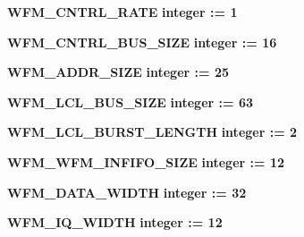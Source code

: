\begin{DoxyCompactItemize}
\item 
{\bf W\+F\+M\+\_\+\+C\+N\+T\+R\+L\+\_\+\+R\+A\+TE} {\bfseries {\bfseries \textcolor{comment}{integer}\textcolor{vhdlchar}{ }\textcolor{vhdlchar}{ }\textcolor{vhdlchar}{\+:}\textcolor{vhdlchar}{=}\textcolor{vhdlchar}{ }\textcolor{vhdlchar}{ } \textcolor{vhdldigit}{1} \textcolor{vhdlchar}{ }}}
\item 
{\bf W\+F\+M\+\_\+\+C\+N\+T\+R\+L\+\_\+\+B\+U\+S\+\_\+\+S\+I\+ZE} {\bfseries {\bfseries \textcolor{comment}{integer}\textcolor{vhdlchar}{ }\textcolor{vhdlchar}{ }\textcolor{vhdlchar}{\+:}\textcolor{vhdlchar}{=}\textcolor{vhdlchar}{ }\textcolor{vhdlchar}{ } \textcolor{vhdldigit}{16} \textcolor{vhdlchar}{ }}}
\item 
{\bf W\+F\+M\+\_\+\+A\+D\+D\+R\+\_\+\+S\+I\+ZE} {\bfseries {\bfseries \textcolor{comment}{integer}\textcolor{vhdlchar}{ }\textcolor{vhdlchar}{ }\textcolor{vhdlchar}{\+:}\textcolor{vhdlchar}{=}\textcolor{vhdlchar}{ }\textcolor{vhdlchar}{ } \textcolor{vhdldigit}{25} \textcolor{vhdlchar}{ }}}
\item 
{\bf W\+F\+M\+\_\+\+L\+C\+L\+\_\+\+B\+U\+S\+\_\+\+S\+I\+ZE} {\bfseries {\bfseries \textcolor{comment}{integer}\textcolor{vhdlchar}{ }\textcolor{vhdlchar}{ }\textcolor{vhdlchar}{\+:}\textcolor{vhdlchar}{=}\textcolor{vhdlchar}{ }\textcolor{vhdlchar}{ } \textcolor{vhdldigit}{63} \textcolor{vhdlchar}{ }}}
\item 
{\bf W\+F\+M\+\_\+\+L\+C\+L\+\_\+\+B\+U\+R\+S\+T\+\_\+\+L\+E\+N\+G\+TH} {\bfseries {\bfseries \textcolor{comment}{integer}\textcolor{vhdlchar}{ }\textcolor{vhdlchar}{ }\textcolor{vhdlchar}{\+:}\textcolor{vhdlchar}{=}\textcolor{vhdlchar}{ }\textcolor{vhdlchar}{ } \textcolor{vhdldigit}{2} \textcolor{vhdlchar}{ }}}
\item 
{\bf W\+F\+M\+\_\+\+W\+F\+M\+\_\+\+I\+N\+F\+I\+F\+O\+\_\+\+S\+I\+ZE} {\bfseries {\bfseries \textcolor{comment}{integer}\textcolor{vhdlchar}{ }\textcolor{vhdlchar}{ }\textcolor{vhdlchar}{\+:}\textcolor{vhdlchar}{=}\textcolor{vhdlchar}{ }\textcolor{vhdlchar}{ } \textcolor{vhdldigit}{12} \textcolor{vhdlchar}{ }}}
\item 
{\bf W\+F\+M\+\_\+\+D\+A\+T\+A\+\_\+\+W\+I\+D\+TH} {\bfseries {\bfseries \textcolor{comment}{integer}\textcolor{vhdlchar}{ }\textcolor{vhdlchar}{ }\textcolor{vhdlchar}{\+:}\textcolor{vhdlchar}{=}\textcolor{vhdlchar}{ }\textcolor{vhdlchar}{ } \textcolor{vhdldigit}{32} \textcolor{vhdlchar}{ }}}
\item 
{\bf W\+F\+M\+\_\+\+I\+Q\+\_\+\+W\+I\+D\+TH} {\bfseries {\bfseries \textcolor{comment}{integer}\textcolor{vhdlchar}{ }\textcolor{vhdlchar}{ }\textcolor{vhdlchar}{\+:}\textcolor{vhdlchar}{=}\textcolor{vhdlchar}{ }\textcolor{vhdlchar}{ } \textcolor{vhdldigit}{12} \textcolor{vhdlchar}{ }}}
\end{DoxyCompactItemize}
